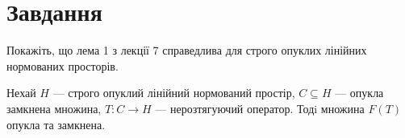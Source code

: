 
\chapter{Завдання \theHchapter}

\begin{tcolorbox}[title=Завдання]
    Покажіть, що лема 1 з лекції 7 справедлива для строго 
    опуклих лінійних нормованих просторів.
\end{tcolorbox}

\begin{tcolorbox}[title=Лема]
    Нехай $H$ — строго опуклий лінійний нормований простір, 
    $C \subseteq H$ — опукла замкнена
    множина, $T : C \rightarrow H$ — нерозтягуючий оператор. 
    Тодi множина $F(T)$ опукла та замкнена.
\end{tcolorbox}

